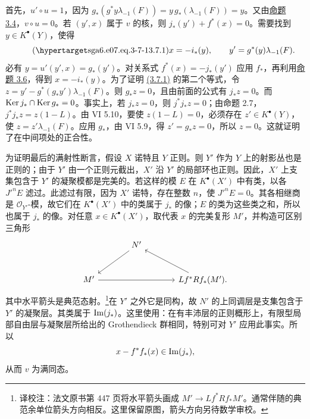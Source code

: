 首先，\(u'\circ u=1\)，因为 \(g_*(g^*y\lambda_{-1}(F))=y\,g_*(\lambda_{-1}(F))=y\)。又由\hyperlink{sga6.e07.prop.3-4}{命题 3.4}，\(v\circ u=0\)。若 \((y',x)\) 属于 \(v\) 的核，则 \(j_*(y')+f^*(x)=0\)。需要找到 \(y\in K^\bullet(Y)\)，使得
\begin{equation}\tag{\sgaStableTargetInline{sga6.e07.eq.3-7-1}3.7.1}
x=-i_*(y),\qquad y'=g^*(y)\lambda_{-1}(F).
\end{equation}
必有 \(y=u'(y',x)=g_*(y')\)。对关系式 \(f^*(x)=-j_*(y')\) 应用 \(f_*\)，再利用\hyperlink{sga6.e07.prop.3-6}{命题 3.6}，得到 \(x=-i_*(y)\)。为了证明 \hyperlink{sga6.e07.eq.3-7-1}{(3.7.1)} 的第二个等式，令 \(z=y'-g^*(g_*y')\lambda_{-1}(F)\)。则 \(g_*z=0\)，且由前面的公式有 \(j_*z=0\)。而 \(\operatorname{Ker} j_*\cap\operatorname{Ker} g_*=0\)。事实上，若 \(j_*z=0\)，则 \(j^*j_*z=0\)；由命题 2.7，\(j^*j_*z=z(1-L)\)。由 VI 5.10，要使 \(z(1-L)=0\)，必须存在 \(z'\in K^\bullet(Y)\)，使 \(z=z'\lambda_{-1}(F)\)。应用 \(g_*\)，由 VI 5.9，得 \(z'=g_*z=0\)，所以 \(z=0\)。这就证明了在中间项处的正合性。

为证明最后的满射性断言，假设 \(X\) 诺特且 \(Y\) 正则。则 \(Y'\) 作为 \(Y\) 上的射影丛也是正则的；由于 \(Y'\) 由一个正则元截出，\(X'\) 沿 \(Y'\) 的局部环也正则。因此，\(X'\) 上支集包含于 \(Y'\) 的凝聚模都是完美的。若这样的模 \(E\) 在 \(K^\bullet(X')\) 中有类，以各 \(J'^nE\) 滤过。此滤过有限，因为 \(X'\) 诺特，存在整数 \(n\)，使 \(J'^nE=0\)。其各相继商是 \(\mathcal O_{Y'}\)-模，故它们在 \(K^\bullet(X')\) 中的类属于 \(j_*\) 的像；\(E\) 的类为这些类之和，所以也属于 \(j_*\) 的像。对任意 \(x\in K^\bullet(X')\)，取代表 \(x\) 的完美复形 \(M'\)，并构造可区别三角形
\[
\begin{tikzcd}[column sep=large,row sep=large]
& N' \arrow[dl] &\\
M' \arrow[rr] && Lf^*Rf_*(M') \arrow[ul].
\end{tikzcd}
\]
其中水平箭头是典范态射。\footnote{译校注：法文原书第 447 页将水平箭头画成 \(M'\to Lf^*Rf_*M'\)。通常伴随的典范余单位箭头方向相反。这里保留原图，箭头方向另待数学审校。}在 \(Y'\) 之外它是同构，故 \(N'\) 的上同调层是支集包含于 \(Y'\) 的凝聚层。其类属于 \(\Imf(j_*)\)。这里使用：在有丰沛层的正则概形上，有限型局部自由层与凝聚层所给出的 Grothendieck 群相同，特别可对 \(Y'\) 应用此事实。所以
\[
x-f^*f_*(x)\in\Imf(j_*),
\]
从而 \(v\) 为满同态。



\providecommand{\Q}{\mathbb Q}
\providecommand{\bfP}{\mathbf P}
\providecommand{\gr}{\operatorname{gr}}
\providecommand{\Id}{\operatorname{Id}}
\providecommand{\Fil}{\operatorname{Fil}}
\providecommand{\Imf}{\operatorname{Im}}
\providecommand{\rank}{\operatorname{rank}}
\providecommand{\codim}{\operatorname{codim}}
\providecommand{\cJ}{\mathcal J}
\providecommand{\cI}{\mathcal I}
\providecommand{\cN}{\mathcal N}
\providecommand{\cE}{\mathcal E}
\providecommand{\cO}{\mathcal O}


